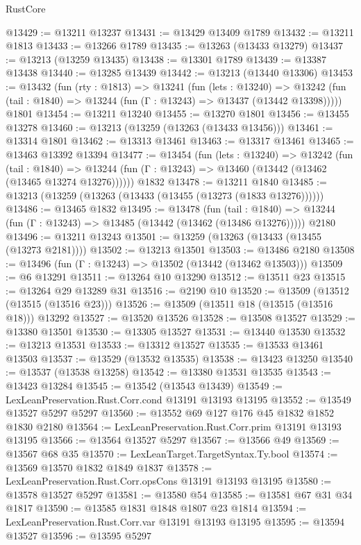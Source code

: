 \begin{lexlean}{RustCore}
\begin{coremodule}
@13429 := @13211 @13237
@13431 := @13429 @13409 @1789
@13432 := @13211 @1813
@13433 := @13266 @1789
@13435 := @13263 (@13433 @13279)
@13437 := @13213 (@13259 @13435)
@13438 := @13301 @1789
@13439 := @13387 @13438
@13440 := @13285 @13439
@13442 := @13213 (@13440 @13306)
@13453 := @13432
    (fun (rty : @1813) =>
    @13241
      (fun (lets : @13240) =>
      @13242 (fun (tail : @1840) => @13244 (fun (Γ : @13243) => @13437 (@13442 @13398)))))
    @1801
@13454 := @13211 @13240
@13455 := @13270 @1801
@13456 := @13455 @13278
@13460 := @13213 (@13259 (@13263 (@13433 @13456)))
@13461 := @13314 @1801
@13462 := @13313 @13461
@13463 := @13317 @13461
@13465 := @13463 @13392 @13394
@13477 := @13454
    (fun (lets : @13240) =>
    @13242
      (fun (tail : @1840) =>
      @13244 (fun (Γ : @13243) => @13460 (@13442 (@13462 (@13465 @13274 @13276))))))
    @1832
@13478 := @13211 @1840
@13485 := @13213 (@13259 (@13263 (@13433 (@13455 (@13273 (@1833 @13276))))))
@13486 := @13465 @1832
@13495 := @13478
    (fun (tail : @1840) => @13244 (fun (Γ : @13243) => @13485 (@13442 (@13462 (@13486 @13276)))))
    @2180
@13496 := @13211 @13243
@13501 := @13259 (@13263 (@13433 (@13455 (@13273 @2181))))
@13502 := @13213 @13501
@13503 := @13486 @2180
@13508 := @13496 (fun (Γ : @13243) => @13502 (@13442 (@13462 @13503)))
@13509 := @6 @13291
@13511 := @13264 @10 @13290
@13512 := @13511 @23
@13515 := @13264 @29 @13289 @31
@13516 := @2190 @10
@13520 := @13509 (@13512 (@13515 (@13516 @23)))
@13526 := @13509 (@13511 @18 (@13515 (@13516 @18))) @13292
@13527 := @13520 @13526
@13528 := @13508 @13527
@13529 := @13380 @13501
@13530 := @13305 @13527
@13531 := @13440 @13530
@13532 := @13213 @13531
@13533 := @13312 @13527
@13535 := @13533 @13461 @13503
@13537 := @13529 (@13532 @13535)
@13538 := @13423 @13250
@13540 := @13537 (@13538 @13258)
@13542 := @13380 @13531 @13535
@13543 := @13423 @13284
@13545 := @13542 (@13543 @13439)
@13549 := LexLeanPreservation.Rust.Corr.cond @13191 @13193 @13195
@13552 := @13549 @13527 @5297 @5297
@13560 := @13552 @69 @127 @176 @45 @1832 @1852 @1830 @2180
@13564 := LexLeanPreservation.Rust.Corr.prim @13191 @13193 @13195
@13566 := @13564 @13527 @5297
@13567 := @13566 @49
@13569 := @13567 @68 @35
@13570 := LexLeanTarget.TargetSyntax.Ty.bool
@13574 := @13569 @13570 @1832 @1849 @1837
@13578 := LexLeanPreservation.Rust.Corr.opsCons @13191 @13193 @13195
@13580 := @13578 @13527 @5297
@13581 := @13580 @54
@13585 := @13581 @67 @31 @34 @1817
@13590 := @13585 @1831 @1848 @1807 @23 @1814
@13594 := LexLeanPreservation.Rust.Corr.var @13191 @13193 @13195
@13595 := @13594 @13527
@13596 := @13595 @5297

\end{coremodule}
\end{lexlean}
